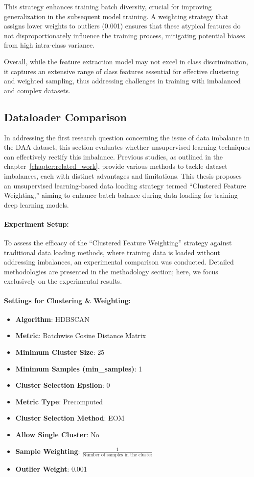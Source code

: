 This strategy enhances training batch diversity, crucial for improving generalization in the subsequent model training. A weighting strategy that assigns lower weights to outliers (0.001) ensures that these atypical features do not disproportionately influence the training process, mitigating potential biases from high intra-class variance.

Overall, while the feature extraction model may not excel in class discrimination, it captures an extensive range of class features essential for effective clustering and weighted sampling, thus addressing challenges in training with imbalanced and complex datasets.

\subsection{Dataloader Comparison}
In addressing the first research question concerning the issue of data imbalance in the DAA dataset, this section evaluates whether unsupervised learning techniques can effectively rectify this imbalance. Previous studies, as outlined in the chapter~\ref{chapter:related_work}, provide various methods to tackle dataset imbalances, each with distinct advantages and limitations. This thesis proposes an unsupervised learning-based data loading strategy termed ``Clustered Feature Weighting,'' aiming to enhance batch balance during data loading for training deep learning models.

\paragraph{Experiment Setup:}
To assess the efficacy of the ``Clustered Feature Weighting'' strategy against traditional data loading methods, where training data is loaded without addressing imbalances, an experimental comparison was conducted. Detailed methodologies are presented in the methodology section; here, we focus exclusively on the experimental results.

\paragraph{Settings for Clustering \& Weighting:}
\begin{itemize}
    \item \textbf{Algorithm}: HDBSCAN
    \item \textbf{Metric}: Batchwise Cosine Distance Matrix
    \item \textbf{Minimum Cluster Size}: 25
    \item \textbf{Minimum Samples (min\_samples)}: 1
    \item \textbf{Cluster Selection Epsilon}: 0
    \item \textbf{Metric Type}: Precomputed
    \item \textbf{Cluster Selection Method}: EOM
    \item \textbf{Allow Single Cluster}: No
    \item \textbf{Sample Weighting}: $\frac{1}{\text{Number of samples in the cluster}}$
    \item \textbf{Outlier Weight}: 0.001
\end{itemize}


